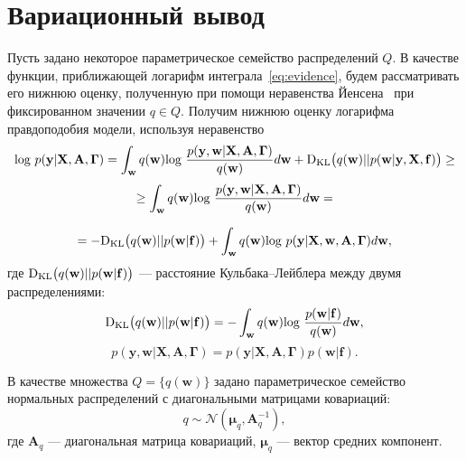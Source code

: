 \documentclass[12pt]{article}
\begin{document}
\section{Вариационный вывод}
Пусть задано некоторое параметрическое семейство распределений $Q.$
{В качестве функции, приближающей логарифм интеграла~\eqref{eq:evidence}, будем рассматривать его нижнюю оценку, полученную при помощи неравенства Йенсена~\cite{Bishop} при фиксированном значении $q \in Q$. Получим нижнюю оценку логарифма правдоподобия модели, используя неравенство}
\begin{equation} 
\label{eq:elbo}
\textnormal{log}~p(\mathbf{y}|\mathbf{X},\mathbf{A},\boldsymbol{\Gamma})  = \int_{\mathbf{w}} q(\mathbf{w})\textnormal{log}~\frac{p(\mathbf{y},\mathbf{w}|\mathbf{X},\mathbf{A},\boldsymbol{\Gamma})}{q(\mathbf{w})}d\mathbf{w} + \textnormal{D}_\textnormal{KL}  \bigl(q(\mathbf{w})||p(\mathbf{w}|\mathbf{y}, \mathbf{X}, \mathbf{f})\bigr) \geq	
\end{equation} 
$$
\geq \int_{\mathbf{w}} q(\mathbf{w})\textnormal{log}~\frac{p(\mathbf{y},\mathbf{w}|\mathbf{X},\mathbf{A},\boldsymbol{\Gamma})}{q(\mathbf{w})}d\mathbf{w} =
$$

$$
= -\textnormal{D}_\textnormal{KL} \bigl(q(\mathbf{w})||p(\mathbf{w}|\mathbf{f})\bigr) + \int_{\mathbf{w}} q(\mathbf{w})\textnormal{log}~{p(\mathbf{y}|\mathbf{X},\mathbf{w},\mathbf{A},\boldsymbol{\Gamma})} d \mathbf{w},
$$
где $\textnormal{D}_\textnormal{KL}\bigl(q(\mathbf{w})||p(\mathbf{w} |\mathbf{f})\bigr)$ --- расстояние Кульбака--Лейблера между двумя распределениями: $$\textnormal{D}_\textnormal{KL}\bigl(q(\mathbf{w})||p(\mathbf{w} |\mathbf{f})\bigr) = -\int_{\mathbf{w}} q(\mathbf{w})\textnormal{log}~\frac{p(\mathbf{w} | \mathbf{f})}{q(\mathbf{w})}d\mathbf{w},$$
$$
p(\mathbf{y},\mathbf{w}|\mathbf{X},\mathbf{A},\boldsymbol{\Gamma}) = p(\mathbf{y}|\mathbf{X},\mathbf{A},\boldsymbol{\Gamma})p(\mathbf{w}|\mathbf{f}).
$$

В качестве множества $Q = \{q(\mathbf{w})\}$ задано параметрическое семейство нормальных распределений с диагональными матрицами ковариаций:
\begin{equation}
\label{eq:diag}
	q \sim \mathcal{N}(\boldsymbol{\mu}_q, \mathbf{A}^{-1}_q),
\end{equation}
где $\mathbf{A}_q$ --- диагональная матрица ковариаций, $\boldsymbol{\mu}_q$ --- вектор средних компонент.
\end{document}
